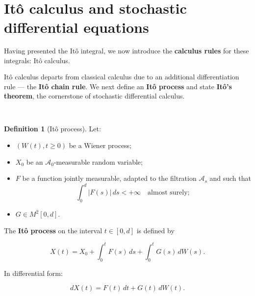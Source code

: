 \documentclass[
  11pt,
  a4paper,
]{book}
\theoremstyle{definition}
\newtheorem{definition}{Definition}[chapter]
\theoremstyle{definition}
\theoremstyle{definition}
\theoremstyle{definition}
\theoremstyle{remark}
\begin{document}
\(\,\)

\section{Itô calculus and stochastic differential equations}\label{itocalc-sde}

Having presented the Itô integral, we now introduce the \textbf{calculus rules} for these integrals: Itô calculus.

Itô calculus departs from classical calculus due to an additional differentiation rule --- the \textbf{Itô chain rule}. We next define an \textbf{Itô process} and state \textbf{Itô's theorem}, the cornerstone of stochastic differential calculus.

\(\,\)

\begin{definition}[Itô process]
Let:

\begin{itemize}
\item
  \((W(t),t\ge 0)\) be a Wiener process;
\item
  \(X_0\) be an \(\mathcal{A}_0\)-measurable random variable;
\item
  \(F\) be a function jointly measurable, adapted to the filtration \(\mathcal{A}_s\) and such that
  \[
  \int_0^d |F(s)|\,ds < +\infty \quad \text{almost surely};
  \]
\item
  \(G\in M^2[0,d]\).
\end{itemize}

The \textbf{Itô process} on the interval \(t\in[0,d]\) is defined by

\[
X(t) = X_0 + \int_0^t F(s)\,ds + \int_0^t G(s)\,dW(s).
\]

In differential form:

\[
dX(t) = F(t)\,dt + G(t)\,dW(t).
\]
\end{definition}

\(\,\)
\end{document}
